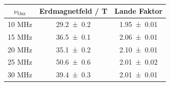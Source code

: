 \begin{table}
  \centering
  \caption{}
  \begin{tabular}{c|c c}
    \toprule
    	$\nu_\text{Osz}$ & Erdmagnetfeld / \mu T & Lande Faktor \\
    \midrule
       	10 MHz & \num{29.2 +- 0.2} & \num{1.95 +- 0.01} \\
	15 MHz & \num{36.5 +- 0.1} & \num{2.06 +- 0.01} \\ 
	20 MHz & \num{35.1 +- 0.2} & \num{2.10 +- 0.01} \\
	25 MHz & \num{50.6 +- 0.6} & \num{2.01 +- 0.02} \\
	30 MHz & \num{39.4 +- 0.3} & \num{2.01 +- 0.01} \\
    \bottomrule
  \end{tabular}
  \label{tab:lande}
\end{table}

